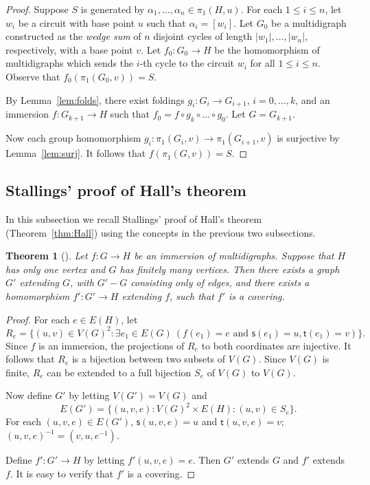 \documentclass[10pt,a4paper]{amsart}
\newtheorem{theorem}{Theorem}[section]
\theoremstyle{definition}
\theoremstyle{definition}
\numberwithin{equation}{section}
\begin{document}
\begin{proof} Suppose $S$ is generated by $\alpha_1, \dots, \alpha_n\in \pi_1(H, u)$. For each $1\leq i\leq n$, let $w_i$ be a circuit with base point $u$ such that $\alpha_i=[w_i]$. Let $G_0$ be a multidigraph constructed as the {\em wedge sum} of $n$ disjoint cycles of length $|w_1|, \dots, |w_n|$, respectively, with a base point $v$. Let $f_0\colon G_0\to H$ be the homomorphism of multidigraphs which sends the $i$-th cycle to the circuit $w_i$ for all $1\leq i\leq n$. Observe that $f_0(\pi_1(G_0, v))=S$. 

By Lemma~\ref{lem:folds}, there exist foldings $g_i\colon G_i\to G_{i+1}$, $i=0,\dots, k$, and an immersion $f\colon G_{k+1}\to H$ such that $f_0=f\circ g_k\circ \dots \circ g_0$. Let $G=G_{k+1}$. 

Now each group homomorphism $g_i\colon \pi_1(G_i, v)\to \pi_1(G_{i+1}, v)$ is surjective by Lemma~\ref{lem:surj}. It follows that $f(\pi_1(G, v))=S$. 
\end{proof}



\subsection{Stallings' proof of Hall's theorem\label{subsec:Stallings}}
In this subsection we recall Stallings' proof of Hall's theorem (Theorem~\ref{thm:Hall}) using the concepts in the previous two subsections.

\begin{theorem}[{\cite[Theorem 6.1]{St83}}] \label{thm:immersion2covering} Let $f\colon G\to H$ be an immersion of multidigraphs. Suppose that $H$ has only one vertex and $G$ has finitely many vertices. Then there exists a graph $G'$ extending $G$, with $G'-G$ consisting only of edges, and there exists a homomorphism $f'\colon G'\to H$ extending $f$, such that $f'$ is a covering. 
\end{theorem}

\begin{proof} For each $e\in E(H)$, let
$$ R_e=\{(u, v)\in V(G)^2\colon \exists e_1\in E(G)\ (f(e_1)=e\mbox{ and } \mathsf{s}(e_1)=u, \mathsf{t}(e_1)=v)\}. $$
Since $f$ is an immersion, the projections of $R_e$ to both coordinates are injective. It follows that $R_e$ is a bijection between two subsets of $V(G)$. Since $V(G)$ is finite, $R_e$ can be extended to a full bijection $S_e$ of $V(G)$ to $V(G)$.

Now define $G'$ by letting $V(G')=V(G)$ and 
$$ E(G')=\{(u,v, e)\colon V(G)^2\times E(H)\colon (u, v)\in S_e\}. $$
For each $(u,v, e)\in E(G')$, $\mathsf{s}(u,v,e)=u$ and $\mathsf{t}(u,v,e)=v$; $(u,v,e)^{-1}=(v,u,e^{-1})$.

Define $f'\colon G'\to H$ by letting $f'(u,v,e)=e$. Then $G'$ extends $G$ and $f'$ extends $f$. It is easy to verify that $f'$ is a covering.
\end{proof}
\end{document}
